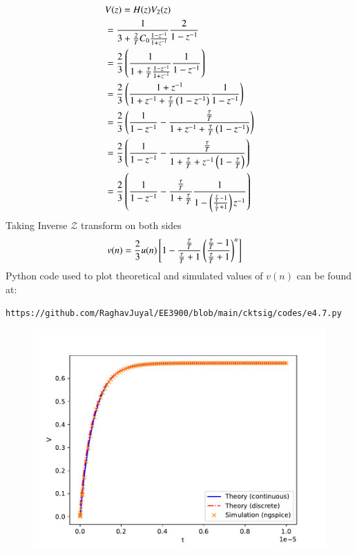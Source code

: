 \documentclass[journal,12pt,twocolumn]{IEEEtran}
\renewcommand\thesection{\arabic{section}}
\begin{document}
\begin{enumerate}[label=\arabic*.,ref=\thesection.\theenumi]
\solution\\
\begin{align}
	&V(z) = H(z)V_2(z)\\
	&= \dfrac{1}{3 +  \frac{2}{T}C_0 \frac{1 - z^{-1}}{1 + z^{-1}}}\frac{2}{1 - z^{-1}}\\
	&= \frac{2}{3}\left(\frac{1}{1 + \frac{\tau}{T}\frac{1 - z^{-1}}{1 + z^{-1}}}\frac{1}{1 - z^{-1}}\right)\\
	&= \frac{2}{3}\left(\frac{1 + z^{-1}}{1 + z^{-1} + \frac{\tau}{T}\left(1 - z^{-1}\right)} \frac{1}{1 - z^{-1}}\right)\\
	&= \frac{2}{3}\left(\frac{1}{1 - z^{-1}} - \frac{\frac{\tau}{T}}{1 + z^{-1} + \frac{\tau}{T}\left(1 - z^{-1}\right)}\right)\\
	&= \frac{2}{3}\left(\frac{1}{1 - z^{-1}} - \frac{\frac{\tau}{T}}{1 + \frac{\tau}{T} + z^{-1}\left(1 - \frac{\tau}{T}\right)}\right)\\
	&= \frac{2}{3}\left(\frac{1}{1 - z^{-1}} - \frac{\frac{\tau}{T}}{1 + \frac{\tau}{T}} \frac{1}{1 - \left(\frac{\frac{\tau}{T} - 1}{\frac{\tau}{T} + 1}\right) z^{-1}}\right)
\end{align}
Taking Inverse $\mathcal{Z}$ transform on both sides
\begin{align}
v(n) &= \frac{2}{3}u(n){}\left[1 - \frac{\frac{\tau}{T}}{\frac{\tau}{T} + 1}\left(\frac{{ \frac{\tau}{T} - 1}}{{\frac{\tau}{T} + 1}}\right)^n\right]
\end{align}
\vspace{2.5cm}
\newline
Python code used to plot theoretical and simulated values of $v(n)$ can be found at:
\begin{lstlisting}
https://github.com/RaghavJuyal/EE3900/blob/main/cktsig/codes/e4.7.py
\end{lstlisting}
\begin{figure}[!ht]
	\begin{center}
		\includegraphics[width=\columnwidth]{./figs/e4.7.pdf}
	\end{center}
	\label{fig:}	
\end{figure}
\end{enumerate}
\end{document}

